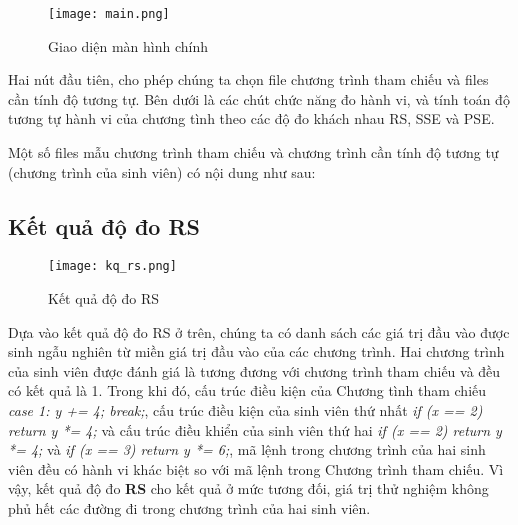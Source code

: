 \begin{center}
  \begin{figure}[H]
    \begin{center}
      \texttt{[image: main.png]}
    \end{center}
    \caption{Giao diện màn hình chính}
  \end{figure}
\end{center}

Hai nút đầu tiên, cho phép chúng ta chọn file chương trình tham chiếu và files cần tính độ tương tự. Bên dưới là các chút chức năng đo hành vi, và tính toán độ tương tự hành vi của chương tình theo các độ đo khách nhau RS, SSE và PSE.

Một số files mẫu chương trình tham chiếu và chương trình cần tính độ tương tự (chương trình của sinh viên) có nội dung như sau:





\subsection{Kết quả độ đo RS}
\begin{center}
  \begin{figure}[H]
    \begin{center}
      \texttt{[image: kq\_rs.png]}
    \end{center}
    \caption{Kết quả độ đo RS}
  \end{figure}
\end{center}

Dựa vào kết quả độ đo RS ở trên, chúng ta có danh sách các giá trị đầu
vào được sinh ngẫu nghiên từ miền giá trị đầu vào của các chương
trình. Hai chương trình của sinh viên được đánh giá là tương đương với
chương trình tham chiếu và đều có kết quả là 1. Trong khi đó, cấu trúc điều
kiện của Chương tình tham chiếu \textit{case 1: y += 4; break;}, cấu trúc điều kiện của sinh viên thứ nhất \textit{if (x == 2) return y *= 4;} và cấu trúc điều khiển của sinh viên thứ hai \textit{if (x == 2) return y *= 4;} và \textit{if (x == 3) return y *= 6;}, mã lệnh trong chương trình của hai sinh viên đều có hành
vi khác biệt so với mã lệnh trong Chương trình tham chiếu. Vì vậy, kết quả độ đo \textbf{RS} cho kết quả ở mức tương đối, giá trị thử nghiệm không phủ hết các đường đi trong chương trình của hai sinh viên.

